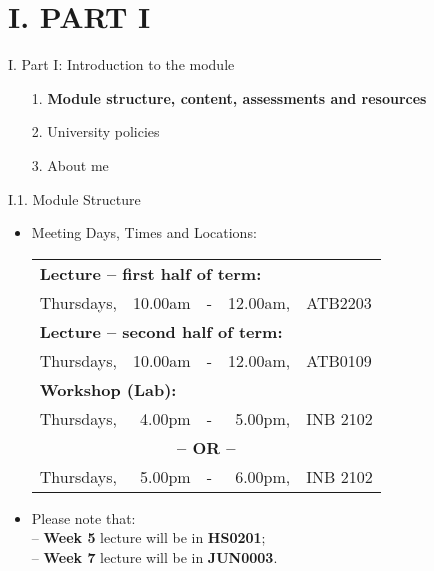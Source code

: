 \documentclass[handout]{beamer}
\newcommand{\stronger}[1]{\textbf{\color{purple} #1}}
\begin{document}
\section{I. PART I}
\begin{frame}{I. Part I: Introduction to the module}
\begin{itemize}
\item[1.] \stronger{Module structure, content, assessments and resources}
\item[2.] University policies
\item[3.] About me
\end{itemize}
\end{frame}
\begin{frame}{I.1. Module Structure}
\begin{itemize}
%
\item Meeting Days, Times and Locations:\\
\vspace{0.2cm}
\begin{tabular}{|lrcrl|}
\hline
\multicolumn{5}{|l|}{\textbf{Lecture -- first half of term:}} \\
Thursdays,     & 10.00am & - & 12.00am, & ATB2203 \\
\multicolumn{5}{|l|}{\textbf{Lecture -- second half of term:}} \\
Thursdays,     & 10.00am & - & 12.00am, & ATB0109 \\
\hline
\hline
\multicolumn{5}{|l|}{\textbf{Workshop (Lab):}} \\
Thursdays,  &  4.00pm & - & 5.00pm, & INB 2102 \\
\multicolumn{5}{|c|}{\textbf{-- OR --}} \\
Thursdays,  &   5.00pm & - &  6.00pm, & INB 2102 \\
\hline
\end{tabular}
\vspace{0.2cm}
\item Please note that:\\
-- \stronger{Week 5} lecture will be in \stronger{HS0201};\\
-- \stronger{Week 7} lecture will be in \stronger{JUN0003}.
%
\end{itemize}
\end{frame}
\end{document}
